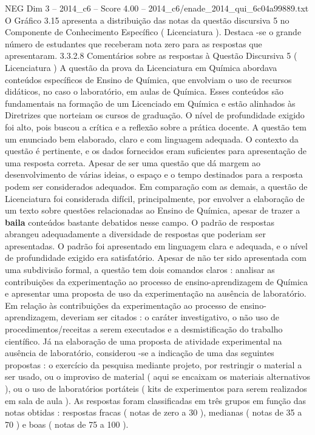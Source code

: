 \begin{textsample}{NEG Dim 3 – 2014\_c6 – Score 4.00 – 2014\_c6/enade\_2014\_qui\_6c04a99889.txt}
O Gráfico 3.15 apresenta a distribuição das notas da questão discursiva 5 no Componente de Conhecimento Específico ( Licenciatura ).
Destaca -se o grande número de estudantes que receberam nota zero para as respostas que apresentaram. 3.3.2.8 Comentários sobre as respostas à Questão Discursiva 5 ( Licenciatura ) A questão da prova da Licenciatura em Química abordava conteúdos específicos de Ensino de Química, que envolviam o uso de recursos didáticos, no caso o laboratório, em aulas de Química.
Esses conteúdos são fundamentais na formação de um Licenciado em Química e estão alinhados às Diretrizes que norteiam os cursos de graduação.
O nível de profundidade exigido foi alto, pois buscou a crítica e a reflexão sobre a prática docente.
A questão tem um enunciado bem elaborado, claro e com linguagem adequada.
O contexto da questão é pertinente, e os dados fornecidos eram suficientes para apresentação de uma resposta correta.
Apesar de ser uma questão que dá margem ao desenvolvimento de várias ideias, o espaço e o tempo destinados para a resposta podem ser considerados adequados.
Em comparação com as demais, a questão de Licenciatura foi considerada difícil, principalmente, por envolver a elaboração de um texto sobre questões relacionadas ao Ensino de Química, apesar de trazer a \textbf{baila} conteúdos bastante debatidos nesse campo.
O padrão de respostas abrangeu adequadamente a diversidade de respostas que poderiam ser apresentadas.
O padrão foi apresentado em linguagem clara e adequada, e o nível de profundidade exigido era satisfatório.
Apesar de não ter sido apresentada com uma subdivisão formal, a questão tem dois comandos claros : analisar as contribuições da experimentação ao processo de ensino-aprendizagem de Química e apresentar uma proposta de uso da experimentação na ausência de laboratório.
Em relação às contribuições da experimentação ao processo de ensino-aprendizagem, deveriam ser citados : o caráter investigativo, o não uso de procedimentos/receitas a serem executados e a desmistificação do trabalho científico.
Já na elaboração de uma proposta de atividade experimental na ausência de laboratório, considerou -se a indicação de uma das seguintes propostas : o exercício da pesquisa mediante projeto, por restringir o material a ser usado, ou o improviso de material ( aqui se encaixam os materiais alternativos ), ou o uso de laboratórios portáteis ( kits de experimentos para serem realizados em sala de aula ).
As respostas foram classificadas em três grupos em função das notas obtidas : respostas fracas ( notas de zero a 30 ), medianas ( notas de 35 a 70 ) e boas ( notas de 75 a 100 ).

\end{textsample}
